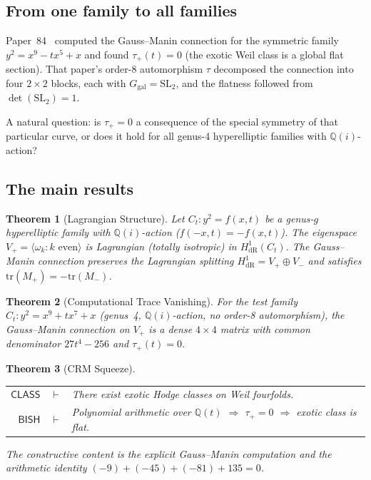 \documentclass[11pt]{article}
\theoremstyle{plain}
\newtheorem{theorem}{Theorem}[section]
\theoremstyle{definition}
\theoremstyle{remark}
\newcommand{\Q}{\mathbb{Q}}
\newcommand{\SL}{\mathrm{SL}}
\newcommand{\tr}{\mathrm{tr}}
\newcommand{\Ggal}{G_{\mathrm{gal}}}
\newcommand{\BISH}{\ensuremath{\mathsf{BISH}}}
\newcommand{\CLASS}{\ensuremath{\mathsf{CLASS}}}
\newcommand{\HdR}{H^1_{\mathrm{dR}}}
\begin{document}
\subsection{From one family to all families}

Paper~84~\cite{Lee2026p84} computed the Gauss--Manin connection for
the symmetric family $y^2 = x^9 - tx^5 + x$ and found
$\tau_+(t) = 0$ (the exotic Weil class is a global flat section).
That paper's order-8 automorphism $\tau$ decomposed the connection
into four $2 \times 2$ blocks, each with $\Ggal = \SL_2$, and the
flatness followed from $\det(\SL_2) = 1$.

A natural question: is $\tau_+ = 0$ a consequence of the special
symmetry of that particular curve, or does it hold for all genus-4
hyperelliptic families with $\Q(i)$-action?

\subsection{The main results}

\begin{theorem}[Lagrangian Structure]\label{thm:A}
Let $C_t\colon y^2 = f(x,t)$ be a genus-$g$ hyperelliptic family
with $\Q(i)$-action ($f(-x,t) = -f(x,t)$).  The eigenspace
$V_+ = \langle\omega_k : k \text{ even}\rangle$ is Lagrangian
(totally isotropic) in $\HdR(C_t)$.  The Gauss--Manin connection
preserves the Lagrangian splitting $\HdR = V_+ \oplus V_-$ and
satisfies $\tr(M_+) = -\tr(M_-)$.
\end{theorem}

\begin{theorem}[Computational Trace Vanishing]\label{thm:B}
For the test family $C_t\colon y^2 = x^9 + tx^7 + x$ (genus~4,
$\Q(i)$-action, no order-8 automorphism), the Gauss--Manin
connection on $V_+$ is a dense $4 \times 4$ matrix with common
denominator $27t^4 - 256$ and $\tau_+(t) = 0$.
\end{theorem}

\begin{theorem}[CRM Squeeze]\label{thm:C}
\begin{center}
\begin{tabular}{rcl}
$\CLASS$ & $\vdash$ & There exist exotic Hodge classes on
  Weil fourfolds.\\
$\BISH$ & $\vdash$ & Polynomial arithmetic over $\Q(t)$
  $\Rightarrow$ $\tau_+ = 0$ $\Rightarrow$ exotic class is flat.
\end{tabular}
\end{center}
The constructive content is the explicit Gauss--Manin computation
and the arithmetic identity $(-9) + (-45) + (-81) + 135 = 0$.
\end{theorem}
\end{document}
